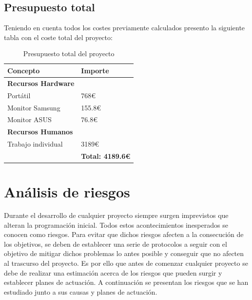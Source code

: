 \subsection{Presupuesto total}

Teniendo en cuenta todos los costes previamente calculados presento la siguiente tabla con el coste total del proyecto:
\begin{table}[H]
    \renewcommand{\arraystretch}{1.5}
    \centering
    \begin{tabular}{w{l}{6cm}w{r}{6cm}}
        \toprule[0.75mm]
        \textbf{Concepto} & \textbf{Importe}\\
        \hline
        \textbf{Recursos Hardware} & \\
        Portátil & 768€\\
        Monitor Samsung & 155.8€\\
        Monitor ASUS & 76.8€\\
        \hline
        \textbf{Recursos Humanos} & \\
        Trabajo individual & 3189€ \\
        \hline
        & \textbf{Total: 4189.6€} \\
        \bottomrule[0.75mm]
    \end{tabular}
    \caption{Presupuesto total del proyecto}
\end{table}


\section{Análisis de riesgos}

Durante el desarrollo de cualquier proyecto siempre surgen imprevistos que alteran la programación inicial. Todos estos acontecimientos inesperados se conocen como riesgos. Para evitar que dichos riesgos afecten a la consecución de los objetivos, se deben de establecer una serie de protocolos a seguir con el objetivo de mitigar dichos problemas lo antes posible y conseguir que no afecten al trascurso del proyecto. Es por ello que antes de comenzar cualquier proyecto se debe de realizar una estimación acerca de los riesgos que pueden surgir y establecer planes de actuación. A continuación se presentan los riesgos que se han estudiado junto a sus causas y planes de actuación.


